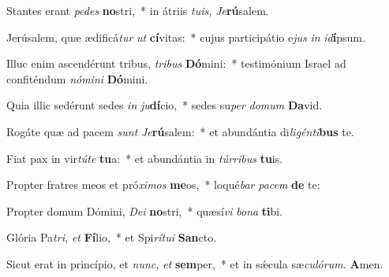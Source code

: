 \item Stantes erant \textit{pedes} \textbf{no}stri,~* in átriis \textit{tuis,} \hspace*{0.02em}\textit{Je}\textbf{rú}salem.
\item Jerúsalem, quæ ædificá\textit{tur} \textit{ut} \textbf{cí}vitas:~* cujus participátio e\textit{jus} \textit{in} \textit{id}\textbf{í}psum.
\item Illuc enim ascendérunt tribus, \textit{tribus} \textbf{Dó}mini:~* testimónium Israel ad confiténdum \textit{nómini} \textbf{Dó}mini.
\item Quia illic sedérunt sedes \textit{in} \textit{ju}\textbf{dí}cio,~* sedes su\textit{per} \textit{domum} \textbf{Da}vid.
\item Rogáte quæ ad pacem \textit{sunt} \textit{Je}\textbf{rú}salem:~* et abundántia di\textit{ligénti}\textbf{bus} te.
\item Fiat pax in vir\textit{túte} \textbf{tu}a:~* et abundántia in \textit{túrribus} \textbf{tu}is.
\item Propter fratres meos et pró\textit{ximos} \textbf{me}os,~* loqué\hspace*{0.01em}\textit{bar} \textit{pacem} \textbf{de} te:
\item Propter domum Dómini, \textit{Dei} \textbf{no}stri,~* quæsí\textit{vi} \textit{bona} \textbf{ti}bi.
\item Glória Pa\tinyhspace\textit{tri,} \textit{et} \textbf{Fí}lio,~* et Spi\textit{rítui} \textbf{San}cto.
\item Sicut erat in princípio, et \textit{nunc,} \textit{et} \textbf{sem}per,~* et in sǽcula sæ\textit{culórum.} \textbf{A}men.